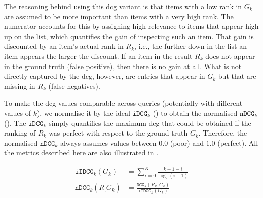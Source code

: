 The reasoning behind using this \acrshort{dcg} variant is that items with a low rank in $G_k$ are assumed to be more important than items with a very high rank. The numerator accounts for this by assigning high relevance to items that appear high up on the list, which quantifies the gain of inspecting such an item. That gain is discounted by an item's actual rank in $R_k$, i.e., the further down in the list an item appears the larger the discount. If an item in the result $R_k$ does not appear in the ground truth (false positive), then there is no gain at all. What is not directly captured by the \acrshort{dcg}, however, are entries that appear in $G_k$ but that are missing in $R_k$ (false negatives).

To make the \acrshort{dcg} values comparable across queries (potentially with different values of $k$), we normalise it by the ideal $\mathtt{iDCG}_k$ () to obtain the normalised $\mathtt{nDCG}_k$ (). The $\mathtt{iDCG}_k$ simply quantifies the maximum \acrshort{dcg} that could be obtained if the ranking of $R_k$ was perfect with respect to the ground truth $G_k$. Therefore, the normalised $\mathtt{nDCG}_k$ always assumes values between $0.0$ (poor) and $1.0$ (perfect). All the metrics described here are also illustrated in .

\begin{align}
    \label{equation:idcg}
    \mathtt{iIDCG}_k(G_k) &= \sum_{i = 0}^{K} \frac{k + 1 - i}{\log_2(i + 1)} \\
    \label{equation:ndcg}
    \mathtt{nDCG}_k(R_, G_k) &= \frac{\mathtt{DCG}_k(R_k, G_k)}{\mathtt{iIDCG}_k(G_k)} 
\end{align}

